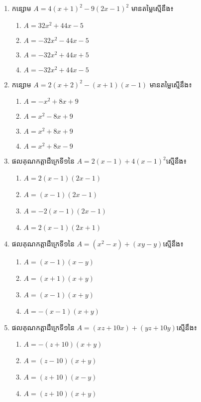 \begin{enumerate}
\item កន្សោម $A=4(x+1)^2-9(2x-1)^2$ មានតម្លៃស្មើនឹង៖
\begin{multicols}{2}
\begin{enumerate}[label=\alph*.]
\item $A=32x^2+44x-5$
\item $A=-32x^2-44x-5$
\item $A=-32x^2+44x+5$
\item $A=-32x^2+44x-5$
\end{enumerate}
\end{multicols}

\item កន្សោម $A=2(x+2)^2-(x+1)(x-1)$ មានតម្លៃស្មើនឹង៖
\begin{multicols}{2}
\begin{enumerate}[label=\alph*.]
\item $A=-x^2+8x+9$
\item $A=x^2-8x+9$
\item $A=x^2+8x+9$
\item $A=x^2+8x-9$
\end{enumerate}
\end{multicols}

\item ផលគុណកត្តាដឺក្រេទី១នៃ $A=2(x-1)+4(x-1)^2$ស្មើនឹង៖
\begin{multicols}{2}
\begin{enumerate}[label=\alph*.]
\item $A=2(x-1)(2x-1)$
\item $A=(x-1)(2x-1)$
\item $A=-2(x-1)(2x-1)$
\item $A=2(x-1)(2x+1)$
\end{enumerate}
\end{multicols}

\item ផលគុណកត្តាដឺក្រេទី១នៃ $A=(x^2-x)+(xy-y)$ស្មើនឹង៖
\begin{multicols}{2}
\begin{enumerate}[label=\alph*.]
\item $A=(x-1)(x-y)$
\item $A=(x+1)(x+y)$
\item $A=(x-1)(x+y)$
\item $A=-(x-1)(x+y)$
\end{enumerate}
\end{multicols}

\item ផលគុណកត្តាដឺក្រេទី១នៃ $A=(xz+10x)+(yz+10y)$ស្មើនឹង៖
\begin{multicols}{2}
\begin{enumerate}[label=\alph*.]
\item $A=-(z+10)(x+y)$
\item $A=(z-10)(x+y)$
\item $A=(z+10)(x-y)$
\item $A=(z+10)(x+y)$
\end{enumerate}
\end{multicols}


\end{enumerate}
